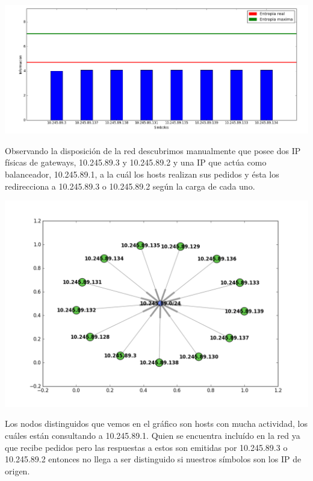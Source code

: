 \begin{center}
\includegraphics[scale=0.4]{imagenes/analisisTCORPcableada/fuenteS1-11.png} 
\end{center}

Observando la disposición de la red descubrimos manualmente que posee dos IP físicas de gateways, 10.245.89.3 y 10.245.89.2 y una IP que actúa como balanceador, 10.245.89.1, a la cuál los hosts realizan sus pedidos y ésta los redirecciona a 10.245.89.3 o 10.245.89.2 según la carga de cada uno.

\begin{center}
\includegraphics[scale=0.65]{imagenes/analisisTCORPcableada/cableada-11sum.png} 
\end{center}

Los nodos distinguidos que vemos en el gráfico son hosts con mucha actividad, los cuáles están consultando a 10.245.89.1. Quien se encuentra incluído en la red ya que recibe pedidos pero las respuestas a estos son emitidas por 10.245.89.3 o 10.245.89.2 entonces no llega a ser distinguido si nuestros símbolos son los IP de origen.\\

